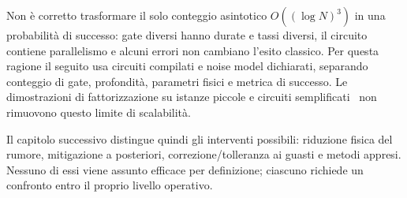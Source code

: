 \begin{onehalfspace}
Non è corretto trasformare il solo conteggio asintotico $O((\log N)^3)$ in una probabilità di successo: gate diversi hanno durate e tassi diversi, il circuito contiene parallelismo e alcuni errori non cambiano l'esito classico. Per questa ragione il seguito usa circuiti compilati e noise model dichiarati, separando conteggio di gate, profondità, parametri fisici e metrica di successo. Le dimostrazioni di fattorizzazione su istanze piccole e circuiti semplificati~\cite{skosana2021} non rimuovono questo limite di scalabilità.

Il capitolo successivo distingue quindi gli interventi possibili: riduzione fisica del rumore, mitigazione a posteriori, correzione/tolleranza ai guasti e metodi appresi. Nessuno di essi viene assunto efficace per definizione; ciascuno richiede un confronto entro il proprio livello operativo.

\end{onehalfspace}

